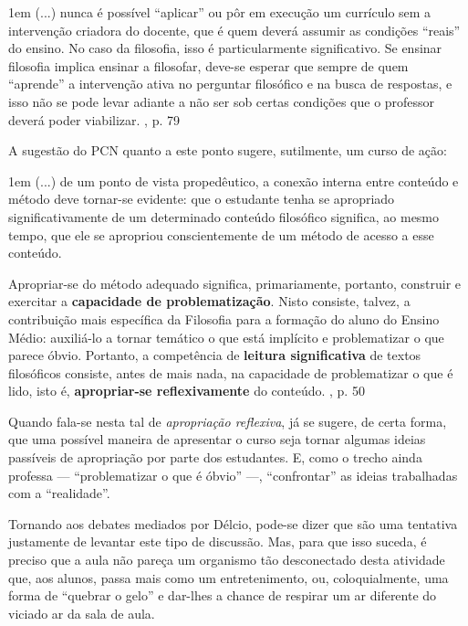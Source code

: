 \documentclass[12pt,a4paper]{article}
\newenvironment{citac}{\begin{addmargin}[4cm]{1em} \footnotesize}{\normalfont \end{addmargin}}
\begin{document}
	\begin{citac}
		(...) nunca é possível ``aplicar'' ou pôr em execução um currículo 
		sem a intervenção criadora do docente, que é quem deverá assumir as 
		condições ``reais'' do ensino. No caso da filosofia, isso é 
		particularmente significativo. Se ensinar filosofia implica ensinar 
		a filosofar, deve-se esperar que sempre de quem ``aprende'' a 
		intervenção ativa no perguntar filosófico e na busca de respostas, e 
		isso não se pode levar adiante a não ser sob certas condições que o 
		professor deverá poder viabilizar. \cite{cerletti}, p. 79
	\end{citac}
	
	A sugestão do PCN quanto a este ponto sugere, sutilmente, um curso de 
	ação: 
	
	\begin{citac}
	(...) de um ponto de vista propedêutico, a conexão interna entre conteúdo e método deve tornar-se evidente: que o estudante tenha se apropriado significativamente de um determinado conteúdo filosófico significa, ao mesmo tempo, que ele se apropriou conscientemente de um método de acesso a esse conteúdo.  
	
		Apropriar-se do método adequado significa, primariamente, portanto, construir e exercitar a \textbf{capacidade de problematização}. Nisto consiste, talvez, a contribuição mais específica da Filosofia para a formação do aluno do Ensino Médio: auxiliá-lo a tornar temático o que está implícito   e   problematizar   o   que   parece   óbvio.   Portanto,   a   competência   de   \textbf{leitura significativa}   de   textos   filosóficos   consiste,   antes   de   mais   nada,   na   capacidade   de   problematizar o que é lido, isto é, \textbf{apropriar-se reflexivamente} do conteúdo. 
		\cite{pcn}, p. 50
	\end{citac} 
	
	Quando fala-se nesta tal de \textit{apropriação reflexiva}, já se 
	sugere, de certa forma, que uma possível maneira de apresentar o curso 
	seja tornar algumas ideias passíveis de apropriação por parte dos 
	estudantes. E, como o trecho ainda professa --- ``problematizar o que é 
	óbvio'' ---, ``confrontar'' as ideias trabalhadas com a ``realidade''. 
	
	Tornando aos debates mediados por Délcio, pode-se dizer que são uma 
	tentativa justamente de levantar este tipo de discussão. Mas, para que 
	isso suceda, é preciso que a aula não pareça um organismo tão desconectado 
	desta atividade que, aos alunos, passa mais como um entretenimento, ou, 
	coloquialmente, uma forma de ``quebrar o gelo'' e dar-lhes a chance de 
	respirar um ar diferente do viciado ar da sala de aula. 
	
\end{document}
